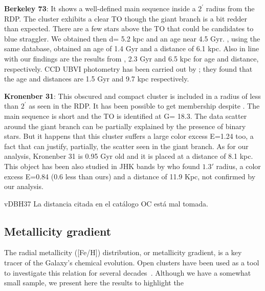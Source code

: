 \documentclass{aa}
\begin{document}
\textbf{Berkeley 73}:
It shows a well-defined main sequence inside a $2^{\prime}$ radius from the RDP. The cluster exhibits a clear TO though the giant branch is a bit redder than expected. There are a few stars above the TO that could be candidates to blue straggler. We obtained then d= 5.2 kpc and an age near 4.5 Gyr. \cite{Cantat_2020}, using the same database, obtained an age of 1.4 Gyr and a distance of 6.1 kpc. Also in line with our findings are the results from \cite{2005A&A...439.1135O}, 2.3 Gyr and 6.5 kpc for age and distance, respectively. CCD UBVI photometry has been carried out by \cite{2005A&A...442..917C}; they found that the age and distances are 1.5 Gyr and 9.7 kpc respectively. 

\textbf{Kronenber 31}:
This obscured and compact cluster is included in a radius of less than $2^{\prime}$ as seen in the RDP. It has been possible to get membership despite . The main sequence is short and the TO is identified at G= 18.3. The data scatter around the giant branch can be partially explained by the presence of binary stars. But it happens that this cluster suffers a large color excess E=1.24 too, a fact that can justify, partially, the scatter seen in the giant branch. As for our analysis, Kronenber 31 is 0.95 Gyr old and it is placed at a distance of 8.1 kpc. This object has been also studied in JHK bands by \cite{2006A&A...447..921K} who found $1.3{\prime}$ radius, a color excess E=0.84 (0.6 less than ours) and a distance of 11.9 Kpc, not confirmed by our analysis.

vDBH37
La distancia citada en el catálogo OC está mal tomada.

 



 \subsection{Metallicity gradient}
  \label{ssec:met_gradient}

  The radial metallicity ([Fe/H]) distribution, or metallicity gradient, is a
  key tracer of the Galaxy's chemical evolution. Open clusters have been used as
  a tool to investigate this relation for several decades~\citep{Janes_1979}.
  Although we have a somewhat small sample, we present here the results to
  highlight the 
\end{document}
